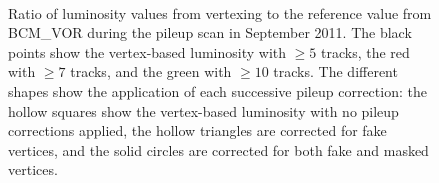 \begin{figure}[htbp]
	\centering
	\\
	\caption{Ratio of luminosity values from vertexing to the reference value from BCM\_VOR during the pileup scan in September 2011. The black points show the vertex-based luminosity with $\geq5$ tracks, the red with $\geq7$ tracks, and the green with $\geq10$ tracks. The different shapes show the application of each successive pileup correction: the hollow squares show the vertex-based luminosity with no pileup corrections applied, the hollow triangles are corrected for fake vertices, and the solid circles are corrected for both fake and masked vertices.}
	\label{reco-luminosity-vertexing-muscan-corrections}
\end{figure}

